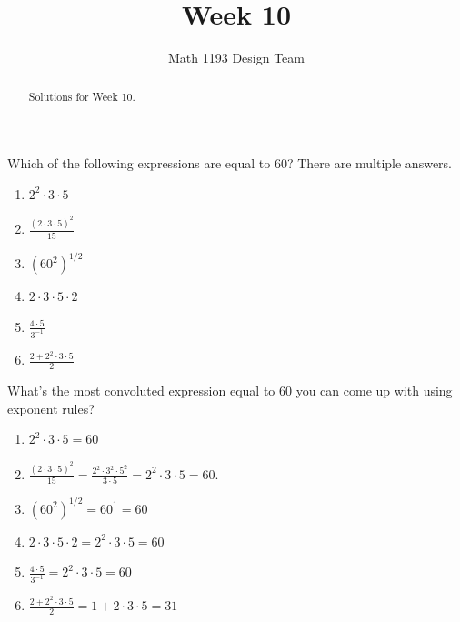 \documentclass[noauthor]{ximera}
\title{Week 10}
\author{Math 1193 Design Team}
\begin{document}
\begin{abstract}
    Solutions for Week 10.
\end{abstract}
\maketitle

\begin{problem}
Which of the following expressions are equal to 60? There are multiple
answers.

\begin{enumerate}
    \item \(2^2 \cdot 3 \cdot 5\)
    \item \(\frac{(2\cdot 3\cdot 5)^2}{15}\)
    \item \((60^2)^{1/2}\)
    \item \(2\cdot 3\cdot 5\cdot 2\)
    \item \(\frac{4\cdot 5}{3^{-1}}\)
    \item \(\frac{2 + 2^2 \cdot 3 \cdot 5}{2}\)
\end{enumerate}

What's the most convoluted expression equal to 60 you can come up
with using exponent rules?

\begin{explanation}
\begin{enumerate}
\item \(2^2 \cdot 3 \cdot 5 = 60\)
\item \(\frac{(2\cdot 3 \cdot 5)^2}{15} = \frac{2^2 \cdot 3^2 \cdot 5^2}{3 \cdot 5} = 2^2 \cdot 3 \cdot 5 = 60\).
\item \((60^2)^{1/2} = 60^1 = 60\)
\item \(2\cdot 3\cdot 5\cdot 2 = 2^2 \cdot 3 \cdot 5 = 60\)
\item \(\frac{4\cdot 5}{3^{-1}} = 2^2 \cdot 3 \cdot 5 = 60\)
\item \(\frac{2 + 2^2 \cdot 3 \cdot 5}{2} = 1 + 2 \cdot 3 \cdot 5 = 31\)
\end{enumerate}


\end{explanation}

\end{problem}
\end{document}
